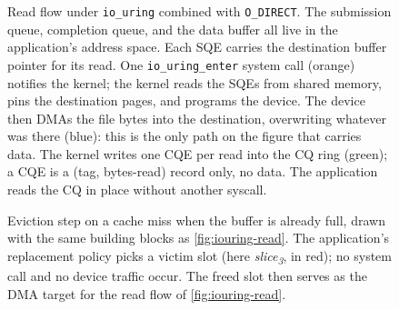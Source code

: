 \begin{figure}[htbp]
\centering
\resizebox{0.95\textwidth}{!}{}
\caption[Read flow under \texttt{io\_uring} with \texttt{O\_DIRECT}]{Read flow under \texttt{io\_uring} combined with \texttt{O\_DIRECT}. The submission queue, completion queue, and the data buffer all live in the application's address space. Each SQE carries the destination buffer pointer for its read. One \texttt{io\_uring\_enter} system call (orange) notifies the kernel; the kernel reads the SQEs from shared memory, pins the destination pages, and programs the device. The device then DMAs the file bytes into the destination, overwriting whatever was there (blue): this is the only path on the figure that carries data. The kernel writes one CQE per read into the CQ ring (green); a CQE is a (tag, bytes-read) record only, no data. The application reads the CQ in place without another syscall.}
\label{fig:iouring-read}
\end{figure}

\begin{figure}[htbp]
\centering
\resizebox{0.95\textwidth}{!}{}
\caption[Eviction under \texttt{io\_uring} with \texttt{O\_DIRECT}]{Eviction step on a cache miss when the buffer is already full, drawn with the same building blocks as \autoref{fig:iouring-read}. The application's replacement policy picks a victim slot (here \emph{slice\textsubscript{3}}, in red); no system call and no device traffic occur. The freed slot then serves as the DMA target for the read flow of \autoref{fig:iouring-read}.}
\label{fig:iouring-evict}
\end{figure}
